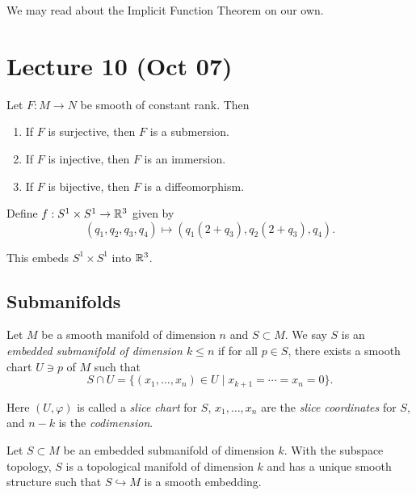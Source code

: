 \documentclass[twoside, 10pt]{article}
\begin{document}
    We may read about the Implicit Function Theorem on our own.

    \section{Lecture 10 (Oct 07)}%

    \begin{thm} Let $F:M \to N$ be smooth of constant rank. Then
        \begin{enumerate} \item If $F$ is surjective, then $F$ is a submersion.
            \item If $F$ is injective, then $F$ is an immersion.  \item If $F$
                is bijective, then $F$ is a diffeomorphism.  \end{enumerate}
            \end{thm}

    \begin{exm} Define $f:S^1 \times S^1 \to \mathbb{R}^3$ given by \[ (q_1, q_2, q_3,
    q_4) \mapsto (q_1(2+q_3), q_2(2+q_3), q_4).\]

        This embeds $S^1 \times S^1$ into $\mathbb{R}^3$.  \end{exm}
    
    \subsection{Submanifolds}%
    
    \begin{defn} Let $M$ be a smooth manifold of dimension $n$ and $S \subset
        M$. We say $S$ is an \textit{embedded submanifold of dimension $k \leq
        n$} if for all $p \in S$, there exists a smooth chart $U \ni p$ of $M$
        such that \[S \cap U = \{(x_1, \ldots, x_n) \in U \mid x_{k+1} = \cdots
        = x_n = 0 \}.\] \end{defn}

    Here $(U, \varphi)$ is called a \textit{slice chart} for $S$, $x_1, \ldots,
    x_n$ are the \textit{slice coordinates} for $S$, and $n-k$ is the
    \textit{codimension}.

    \begin{thm} Let $S \subset M$ be an embedded submanifold of dimension $k$.
        With the subspace topology, $S$ is a topological manifold of dimension
        $k$ and has a unique smooth structure such that $S \hookrightarrow M$
        is a smooth embedding.  \end{thm}
\end{document}
